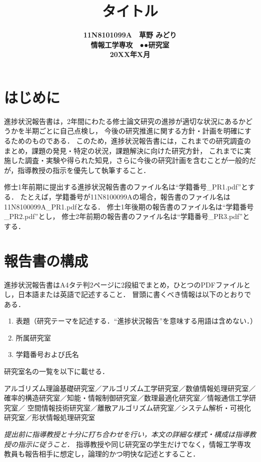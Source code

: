 \documentclass[10pt,a4paper,notitlepage,oneside,twocolumn]{abst_jsarticle}
\title{
{\bf タイトル}
}
\author{\begin{center}
{\large {\bf 11N8101099A　草野 みどり}}\\
{\large {\bf 情報工学専攻　●●研究室}}\\
{\large {\bf 20XX年X月}}
\end{center}}
\date{}
\begin{document}
\maketitle


\section{はじめに} \label{sec:intro}

進捗状況報告書は，2年間にわたる修士論文研究の進捗が適切な状況にあるかどうかを半期ごとに自己点検し，
今後の研究推進に関する方針・計画を明確にするためのものである．
このため，進捗状況報告書には，これまでの研究調査のまとめ，課題の発見・特定の状況，課題解決に向けた研究方針，
これまでに実施した調査・実験や得られた知見，さらに今後の研究計画を含むことが一般的だが，指導教授の指示を優先して執筆すること．

修士1年前期に提出する進捗状況報告書のファイル名は“学籍番号\_PR1.pdf”とする．
たとえば，学籍番号が11N8100099Aの場合，報告書のファイル名は11N8100099A\_PR1.pdfとなる．
修士1年後期の報告書のファイル名は“学籍番号\_PR2.pdf”とし，
修士2年前期の報告書のファイル名は“学籍番号\_PR3.pdf”とする．



\section{報告書の構成}

進捗状況報告書はA4タテ判2ページに2段組でまとめ，ひとつのPDFファイルとし，日本語または英語で記述すること．
冒頭に書くべき情報は以下のとおりである．
\begin{enumerate}
\item 表題（研究テーマを記述する．“進捗状況報告”を意味する用語は含めない．）
\item 所属研究室
\item 学籍番号および氏名
\end{enumerate}
研究室名の一覧を以下に載せる．

\smallskip

\noindent
アルゴリズム理論基礎研究室／アルゴリズム工学研究室／数値情報処理研究室／
確率的構造研究室／知能・情報制御研究室／数理最適化研究室／情報通信工学研究室／
空間情報技術研究室／離散アルゴリズム研究室／システム解析・可視化研究室／形状情報処理研究室

\smallskip


{\em 提出前に指導教授と十分に打ち合わせを行い，本文の詳細な様式・構成は指導教授の指示に従うこと．}
指導教授や同じ研究室の学生だけでなく，情報工学専攻教員も報告相手に想定し，論理的かつ明快な記述とすること．
\end{document}

